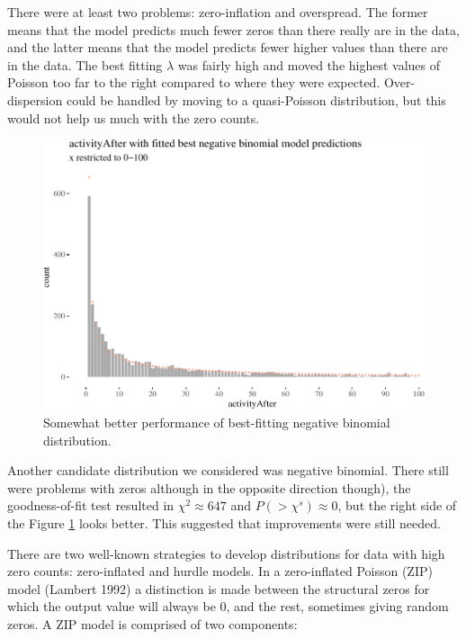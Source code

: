 \documentclass[10pt,]{scrartcl}
\begin{document}
There were at least two problems: zero-inflation and overspread. The
former means that the model predicts much fewer zeros than there really
are in the data, and the latter means that the model predicts fewer
higher values than there are in the data. The best fitting \(\lambda\)
was fairly high and moved the highest values of Poisson too far to the
right compared to where they were expected. Over-dispersion could be
handled by moving to a quasi-Poisson distribution, but this would not
help us much with the zero counts.

\footnotesize

\normalsize 

\begin{figure}

\begin{center}\includegraphics[width=1\linewidth]{redditAnalysisWalkthrough_files/figure-latex/unnamed-chunk-71-1} \end{center}
\caption{Somewhat better performance of best-fitting negative binomial distribution.}
\label{fig:nbinperf}
\end{figure}

Another candidate distribution we considered was negative binomial.
There still were problems with zeros although in the opposite direction
though), the goodness-of-fit test resulted in \(\chi^2 \approx 647\) and
\(P(>\chi^s)\approx 0\), but the right side of the Figure
\ref{fig:nbinperf} looks better. This suggested that improvements were
still needed.

There are two well-known strategies to develop distributions for data
with high zero counts: zero-inflated and hurdle models. In a
zero-inflated Poisson (ZIP) model (Lambert 1992) a distinction is made
between the structural zeros for which the output value will always be
0, and the rest, sometimes giving random zeros. A ZIP model is comprised
of two components:
\end{document}
